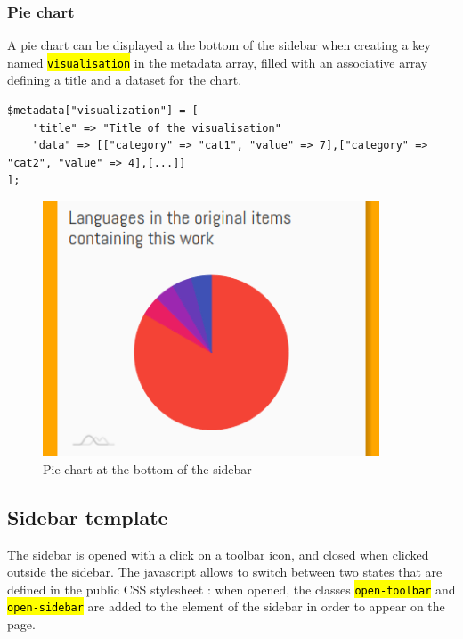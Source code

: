 \documentclass[a4paper,12pt,twoside]{book}
\let\OldTexttt\texttt
\renewcommand{\texttt}[1]{\OldTexttt{\hl{#1}}}
\begin{document}
				\subsubsection{Pie chart}\label{pie-chart}

A pie chart can be displayed a the bottom of the sidebar when creating a key named \texttt{visualisation} in the metadata array, filled with an associative array defining a title and a dataset for the chart.

\begin{lstlisting}
$metadata["visualization"] = [
    "title" => "Title of the visualisation"
    "data" => [["category" => "cat1", "value" => 7],["category" => "cat2", "value" => 4],[...]]
];
\end{lstlisting}

\begin{figure}[H]
	\centering
	\includegraphics[width=10cm]{Images/Sidebar/pie-work.png}
	\caption{Pie chart at the bottom of the sidebar}
\end{figure}

			\subsection{Sidebar template}\label{sidebar-template}

The sidebar is opened with a click on a toolbar icon, and closed when clicked outside the sidebar. The javascript allows to switch between two states that are defined in the public CSS stylesheet : when opened, the classes \texttt{open-toolbar} and \texttt{open-sidebar} are added to the element of the sidebar in order to appear on the page.
\end{document}
